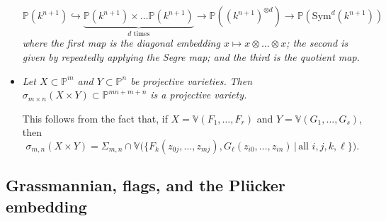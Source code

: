 \documentclass[10pt]{article}
\newcommand{\van}{\mathbb{V}}
\newcommand{\pee}{\mathbb{P}}
\begin{document}
\begin{itemize}
                    \begin{equation*}
                        \pee(k^{n+1}) \hookrightarrow \underbrace{\pee(k^{n+1})\times\ldots\pee(k^{n+1})}_{d\text{ times}} \to \pee((k^{n+1})^{\otimes d}) \to \pee(\mathrm{Sym}^d(k^{n+1}))
                    \end{equation*}
                    \emph{where the first map is the diagonal embedding $x\mapsto x\otimes\ldots\otimes x$; the second is given by repeatedly applying the Segre map; and the third is the quotient map.}
                \item \emph{Let $X\subset\pee^m$ and $Y\subset\pee^n$ be projective varieties.}
                    \emph{Then $\sigma_{m\times n}(X\times Y)\subset\pee^{mn+m+n}$ is a projective variety.}

                    This follows from the fact that, if $X=\van(F_1,\ldots,F_r)$ and $Y=\van(G_1,\ldots,G_s)$, then
                    \begin{equation*}
                        \sigma_{m,n}(X\times Y) = \Sigma_{m,n}\cap\van\big(\{F_k(z_{0j},\ldots,z_{mj}),G_\ell(z_{i0},\ldots,z_{in})\,\big|\,\text{all }i,j,k,\ell\}\big).
                    \end{equation*}
            \end{itemize}

        \subsection{Grassmannian, flags, and the Plücker embedding}
\end{document}
